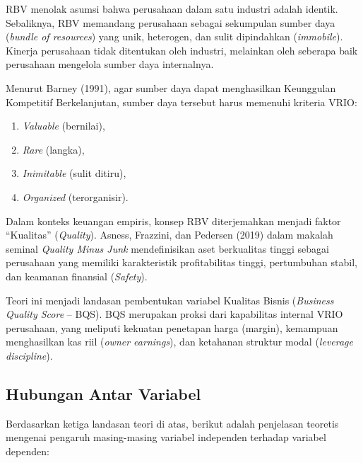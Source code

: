\documentclass[12pt,a4paper]{report}
\begin{document}
RBV menolak asumsi bahwa perusahaan dalam satu industri adalah identik. Sebaliknya, RBV memandang perusahaan sebagai sekumpulan sumber daya (\textit{bundle of resources}) yang unik, heterogen, dan sulit dipindahkan (\textit{immobile}). Kinerja perusahaan tidak ditentukan oleh industri, melainkan oleh seberapa baik perusahaan mengelola sumber daya internalnya.

Menurut Barney (1991), agar sumber daya dapat menghasilkan Keunggulan Kompetitif Berkelanjutan, sumber daya tersebut harus memenuhi kriteria VRIO:

\begin{enumerate}
    \item \textit{Valuable} (bernilai),
    \item \textit{Rare} (langka),
    \item \textit{Inimitable} (sulit ditiru),
    \item \textit{Organized} (terorganisir).
\end{enumerate}

Dalam konteks keuangan empiris, konsep RBV diterjemahkan menjadi faktor ``Kualitas'' (\textit{Quality}). Asness, Frazzini, dan Pedersen (2019) dalam makalah seminal \textit{Quality Minus Junk} mendefinisikan aset berkualitas tinggi sebagai perusahaan yang memiliki karakteristik profitabilitas tinggi, pertumbuhan stabil, dan keamanan finansial (\textit{Safety}).

Teori ini menjadi landasan pembentukan variabel Kualitas Bisnis (\textit{Business Quality Score} -- BQS). BQS merupakan proksi dari kapabilitas internal VRIO perusahaan, yang meliputi kekuatan penetapan harga (margin), kemampuan menghasilkan kas riil (\textit{owner earnings}), dan ketahanan struktur modal (\textit{leverage discipline}).

\subsection{Hubungan Antar Variabel}

Berdasarkan ketiga landasan teori di atas, berikut adalah penjelasan teoretis mengenai pengaruh masing-masing variabel independen terhadap variabel dependen:
\end{document}
